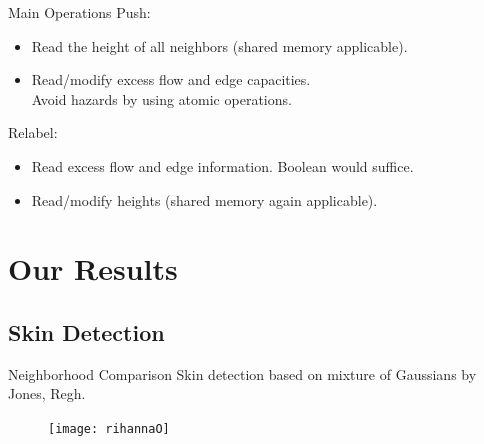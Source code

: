 \documentclass{beamer}
\begin{document}
\begin{frame}{Main Operations}
 Push:
 \begin{itemize}
   \item
   Read the height of all neighbors (\alert{shared memory} applicable).
   \item
   Read/modify excess flow and edge capacities. \\Avoid hazards by using \alert{atomic operations}.
 \end{itemize}
 Relabel:
 \begin{itemize}
   \item
   Read excess flow and edge information. \alert{Boolean} would suffice.
   \item
   Read/modify heights (\alert{shared memory} again applicable).
 \end{itemize}
\end{frame}


\section{Our Results}

\subsection{Skin Detection}

\begin{frame}{Neighborhood Comparison}
      Skin detection based on mixture of Gaussians by Jones, Regh.
		\begin{figure}
		\texttt{[image: rihannaO]} 
		\end{figure}
\end{frame}
\end{document}
